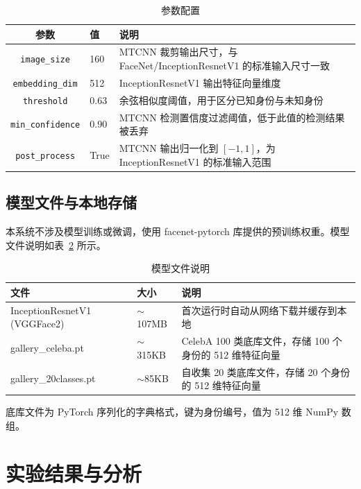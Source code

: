 \documentclass[12pt, a4paper]{article}
\begin{document}
\begin{table}[H]
\centering
\caption{参数配置}
\label{tab:params}
\begin{tabular}{clp{7cm}}
\toprule
参数 & 值 & 说明 \\
\midrule
\texttt{image\_size} & 160 & MTCNN 裁剪输出尺寸，与 FaceNet/InceptionResnetV1 的标准输入尺寸一致 \\
\texttt{embedding\_dim} & 512 & InceptionResnetV1 输出特征向量维度 \\
\texttt{threshold} & 0.63 & 余弦相似度阈值，用于区分已知身份与未知身份 \\
\texttt{min\_confidence} & 0.90 & MTCNN 检测置信度过滤阈值，低于此值的检测结果被丢弃 \\
\texttt{post\_process} & True & MTCNN 输出归一化到 $[-1, 1]$，为 InceptionResnetV1 的标准输入范围 \\
\bottomrule
\end{tabular}
\end{table}

\subsection{模型文件与本地存储}

本系统不涉及模型训练或微调，使用 facenet-pytorch 库提供的预训练权重。模型文件说明如表~\ref{tab:model-files} 所示。

\begin{table}[H]
\centering
\caption{模型文件说明}
\label{tab:model-files}
\begin{tabular}{llp{6.5cm}}
\toprule
文件 & 大小 & 说明 \\
\midrule
InceptionResnetV1 (VGGFace2) & $\sim$107MB & 首次运行时自动从网络下载并缓存到本地 \\
gallery\_celeba.pt & $\sim$315KB & CelebA 100 类底库文件，存储 100 个身份的 512 维特征向量 \\
gallery\_20classes.pt & $\sim$85KB & 自收集 20 类底库文件，存储 20 个身份的 512 维特征向量 \\
\bottomrule
\end{tabular}
\end{table}

底库文件为 PyTorch 序列化的字典格式，键为身份编号，值为 512 维 NumPy 数组。


\section{实验结果与分析}
\end{document}
